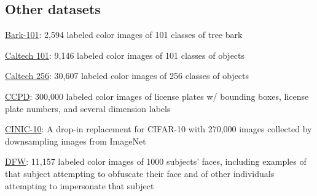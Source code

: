 \documentclass{tufte-handout}
\begin{document}
\subsection{Other datasets}\label{other-datasets}

\bi
\item
  \href{http://eidolon.univ-lyon2.fr/~remi1/Bark-101/}{Bark-101}: 2,594
  labeled color images of 101 classes of tree bark
\item
  \href{http://www.vision.caltech.edu/Image_Datasets/Caltech101/}{Caltech
  101}: 9,146 labeled color images of 101 classes of objects
\item
  \href{http://www.vision.caltech.edu/Image_Datasets/Caltech256/}{Caltech
  256}: 30,607 labeled color images of 256 classes of objects
\item
  \href{https://github.com/detectRecog/CCPD}{CCPD}: 300,000 labeled
  color images of license plates w/ bounding boxes, license plate
  numbers, and several dimension labels
\item
  \href{https://github.com/BayesWatch/cinic-10}{CINIC-10}: A drop-in
  replacement for CIFAR-10 with 270,000 images collected by downsampling
  images from ImageNet
\item
  \href{http://iab-rubric.org/resources/dfw.html}{DFW}: 11,157 labeled
  color images of 1000 subjects' faces, including examples of that
  subject attempting to obfuscate their face and of other individuals
  attempting to impersonate that subject
\item
\end{document}
